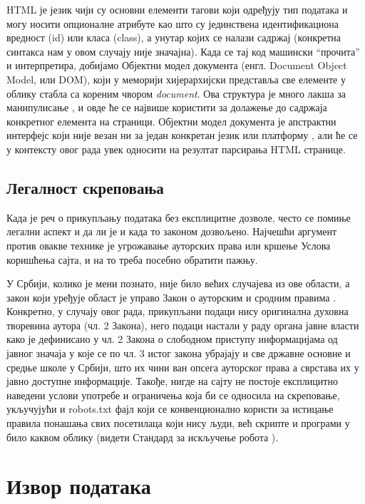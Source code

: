 HTML је језик чији су основни елементи тагови који одређују тип података и могу носити опционалне атрибуте као што су јединствена идентификациона вредност (id) или класа (class), а унутар којих се налази садржај (конкретна синтакса нам у овом случају није значајна). Када се тај код машински \enquote{прочита} и интерпретира, добијамо Објектни модел документа (енгл. Document Object Model, или DOM), који у меморији хијерархијски представља све елементе у облику стабла са кореним чвором \emph{document}. Ова структура је много лакша за манипулисање \citep{gupta2003dom}, и овде ће се највише користити за долажење до садржаја конкретног елемента на страници. Објектни модел документа је апстрактни интерфејс који није везан ни за један конкретан језик или платформу \citep{w3domdef}, али ће се у контексту овог рада увек односити на резултат парсирања HTML странице.

\subsection{Легалност скреповања}

Када је реч о прикупљању података без експлицитне дозволе, често се помиње легални аспект и да ли је и када то законом дозвољено. Најчешћи аргумент против овакве технике је угрожавање ауторских права или кршење Услова коришћења сајта, и на то треба посебно обратити пажњу. 

У Србији, колико је мени познато, није било већих случајева из ове области, а закон који уређује област је управо Закон о ауторским и сродним правима \citep{autorskaprava}. Конкретно, у случају овог рада, прикупљани подаци нису оригинална духовна творевина аутора (чл. 2 Закона), него подаци настали у раду органа јавне власти како је дефинисано у чл. 2 Закона о слободном приступу информацијама од јавног значаја \citep{zospi} у које се по чл. 3 истог закона убрајају и све државне основне и средње школе у Србији, што их чини ван опсега ауторског права а сврстава их у јавно доступне информације. Такође, нигде на сајту не постоје експлицитно наведени услови употребе и ограничења која би се односила на скреповање, укључујући и robots.txt фајл који се конвенционално користи за истицање правила понашања свих посетилаца који нису људи, већ скрипте и програми у било каквом облику (видети Стандард за искључење робота \citep{robotstxt}).

\section{Извор података}

